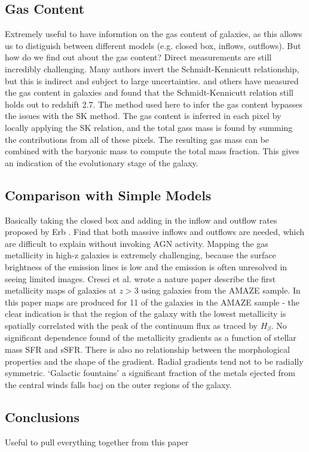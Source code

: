 \documentclass{literature}
\begin{document}
\subsection{Gas Content}
Extremely useful to have informtion on the gas content of galaxies, as this allows us to distiguish between different models (e.g. closed box, inflows, outflows). But how do we find out about the gas content? Direct measurements are still incredibly challenging. Many authors invert the Schmidt-Kennicutt relationship, but this is indirect and subject to large uncertainties. \citep{Tacconi2013} and others have measured the gas content in galaxies and found that the Schmidt-Kennicutt relation still holds out to redshift 2.7. The method used here to infer the gas content bypasses the issues with the SK method. The gas content is inferred in each pixel by locally applying the SK relation, and the total gass mass is found by summing the contributions from all of these pixels. The resulting gas mass can be combined with the baryonic mass to compute the total mass fraction. This gives an indication of the evolutionary stage of the galaxy. 

\subsection{Comparison with Simple Models}
Basically taking the closed box and adding in the inflow and outflow rates proposed by Erb \citep{Erb2008}. Find that both massive inflows and outflows are needed, which are difficult to explain without invoking AGN activity. Mapping the gas metallicity in high-z galaxies is extremely challenging, because the surface brightness of the emission lines is low and the emission is often unresolved in seeing limited images. Cresci et al. \citep{Cresci2010} wrote a nature paper describe the first metallicity maps of galaxies at $z > 3$ using galaxies from the AMAZE sample. In this paper maps are produced for 11 of the galaxies in the AMAZE sample - the clear indication is that the region of the galaxy with the lowest metallicity is spatially correlated with the peak of the continuum flux as traced by $H_{\beta}$. No significant dependence found of the metallicity gradients as a function of stellar mass SFR and sSFR. There is also no relationship between the morphological properties and the shape of the gradient. Radial gradients tend not to be radially symmetric. `Galactic fountains' a significant fraction of the metals ejected from the central winds falls bacj on the outer regions of the galaxy. 
\subsection{Conclusions}
Useful to pull everything together from this paper 
\end{document}
